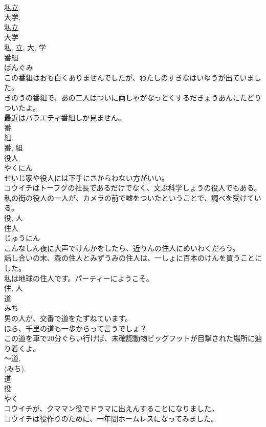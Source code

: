 \documentclass[8pt]{extreport}
\begin{document}
\begin{CJK}{UTF8}{min}
\\	私立, 
\\	大学, 
\\	私立 
\\	大学 
\\	私, 立, 大, 学	
\\	番組	
\\	ばんぐみ	
\\	この番組はおも白くありませんでしたが、わたしのすきなはいゆうが出ていました。	
\\	きのうの番組で、あの二人はついに両しゃがなっとくするだきょうあんにたどりついたよ。	
\\	最近はバラエティ番組しか見ません。	
\\	番 
\\	組. 
\\	番, 組	
\\	役人	
\\	やくにん	
\\	せいじ家や役人には下手にさからわない方がいい。	
\\	コウイチはトーフグの社長であるだけでなく、文ぶ科学しょうの役人でもある。	
\\	私の街の役人の一人が、カメラの前で嘘をついたということで、調べを受けている。	
\\	役, 人	
\\	住人	
\\	じゅうにん	
\\	こんなしん夜に大声でけんかをしたら、近りんの住人にめいわくだろう。	
\\	話し合いの末、森の住人とみずうみの住人は、一しょに百本のけんを買うことにした。	
\\	私は地球の住人です。パーティーにようこそ。	
\\	住, 人	
\\	道	
\\	みち	
\\	男の人が、交番で道をたずねています。	
\\	ほら、千里の道も一歩からって言うでしょ？	
\\	この道を車で20分ぐらい行けば、未確認動物ビッグフットが目撃された場所に辿り着くよ。	
\\	〜道, 
\\	(みち). 
\\	道	
\\	役	
\\	やく	
\\	コウイチが、クママン役でドラマに出えんすることになりました。	
\\	コウイチは役作りのために、一年間ホームレスになってみました。	

\end{CJK}
\end{document}
